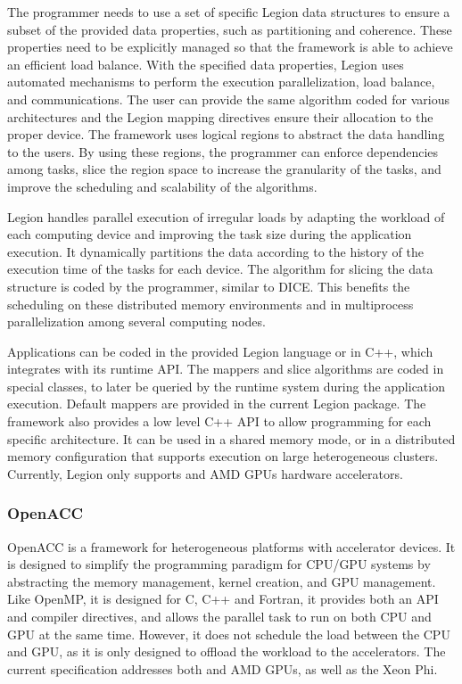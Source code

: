 The programmer needs to use a set of specific Legion data structures to ensure a subset of the provided data properties, such as partitioning and coherence. These properties need to be explicitly managed so that the framework is able to achieve an efficient load balance. With the specified data properties, Legion uses automated mechanisms to perform the execution parallelization, load balance, and communications. The user can provide the same algorithm coded for various architectures and the Legion mapping directives ensure their allocation to the proper device. The framework uses logical regions to abstract the data handling to the users. By using these regions, the programmer can enforce dependencies among tasks, slice the region space to increase the granularity of the tasks, and improve the scheduling and scalability of the algorithms.

Legion handles parallel execution of irregular loads by adapting the workload of each computing device and improving the task size during the application execution. It dynamically partitions the data according to the history of the execution time of the tasks for each device. The algorithm for slicing the data structure is coded by the programmer, similar to DICE. This benefits the scheduling on these distributed memory environments and in multiprocess parallelization among several computing nodes.

Applications can be coded in the provided Legion language or in C++, which integrates with its runtime API. The mappers and slice algorithms are coded in special classes, to later be queried by the runtime system during the application execution. Default mappers are provided in the current Legion package. The framework also provides a low level C++ API to allow programming for each specific architecture. It can be used in a shared memory mode, or in a distributed memory configuration that supports execution on large heterogeneous clusters. Currently, Legion only supports \nvidia and AMD GPUs hardware accelerators.

\subsubsection*{OpenACC}

OpenACC \cite{OpenACC} is a framework for heterogeneous platforms with accelerator devices. It is designed to simplify the programming paradigm for CPU/GPU systems by abstracting the memory management, kernel creation, and GPU management. Like OpenMP, it is designed for C, C++ and Fortran, it provides both an API and compiler directives, and allows the parallel task to run on both CPU and GPU at the same time. However, it does not schedule the load between the CPU and GPU, as it is only designed to offload the workload to the accelerators. The current specification addresses both \nvidia and AMD GPUs, as well as the \intel Xeon Phi.

